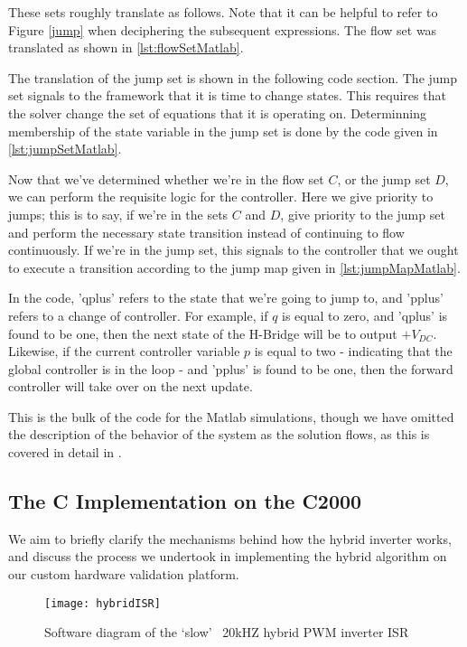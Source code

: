 These sets roughly translate as follows. Note that it can be helpful to refer to Figure \ref{jump} when deciphering the subsequent expressions. The flow set was translated as shown in \ref{lst:flowSetMatlab}.

The translation of the jump set is shown in the following code section. The jump set signals to the framework that it is time to change states. This requires that the solver change the set of equations that it is operating on. Determinning membership of the state variable in the jump set is done by the code given in \ref{lst:jumpSetMatlab}.

Now that we've determined whether we're in the flow set $C$, or the jump set $D$, we can perform the requisite logic for the controller. Here we give priority to jumps; this is to say, if we're in the sets $C$ and $D$, give priority to the jump set and perform the necessary state transition instead of continuing to flow continuously. If we're in the jump set, this signals to the controller that we ought to execute a transition according to the jump map given in \ref{lst:jumpMapMatlab}.

In the code, 'qplus' refers to the state that we're going to jump to, and 'pplus' refers to a change of controller. For example, if $q$ is equal to zero, and 'qplus' is found to be one, then the next state of the H-Bridge will be to output $+V_{DC}$. Likewise, if the current controller variable $p$ is equal to two - indicating that the global controller is in the loop - and 'pplus' is found to be one, then the forward controller will take over on the next update. 

This is the bulk of the code for the Matlab simulations, though we have omitted the description of the behavior of the system as the solution flows, as this is covered in detail in \cite{ricardo}.

\subsection{The C Implementation on the C2000}
We aim to briefly clarify the mechanisms behind how the hybrid inverter works, and discuss the process we undertook in implementing the hybrid algorithm on our custom hardware validation platform. 

\begin{figure}[h]
\begin{center}
\texttt{[image: hybridISR]}
\caption{Software diagram of the `slow' ~20kHZ hybrid PWM inverter ISR}
\label{slow}
\end{center}
\end{figure}

